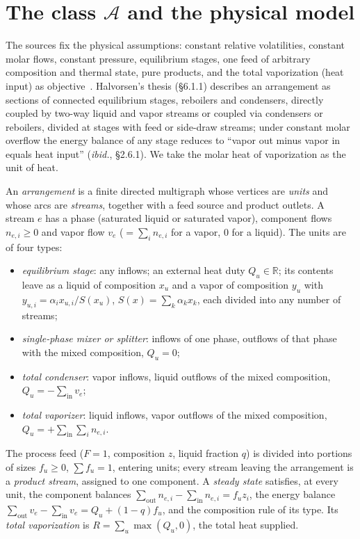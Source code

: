 \section{The class \texorpdfstring{$\mathcal A$}{A} and the physical model}\label{sec:classA}

The sources fix the physical assumptions: constant relative volatilities, constant molar flows, constant pressure,
equilibrium stages, one feed of arbitrary composition and thermal state, pure products, and the total vaporization
(heat input) as objective~\autocite{HS3,HS02,HalvorsenThesis}. Halvorsen's thesis (\S6.1.1) describes an arrangement as
sections of connected equilibrium stages, reboilers and condensers, directly coupled by two-way liquid and vapor
streams or coupled via condensers or reboilers, divided at stages with feed or side-draw streams; under constant molar
overflow the energy balance of any stage reduces to ``vapor out minus vapor in equals heat input'' (\emph{ibid.},
\S2.6.1). We take the molar heat of vaporization as the unit of heat.

\begin{definition}\label{def:A}
An \emph{arrangement} is a finite directed multigraph whose vertices are \emph{units} and whose arcs are
\emph{streams}, together with a feed source and product outlets. A stream $e$ has a phase (saturated liquid or
saturated vapor), component flows $n_{e,i}\ge0$ and vapor flow $v_e$ ($=\sum_in_{e,i}$ for a vapor, $0$ for a liquid).
The units are of four types:
\begin{itemize}
\item[(E)] \emph{equilibrium stage}: any inflows; an external heat duty $Q_u\in\mathbb R$; its contents leave as a liquid of
composition $x_u$ and a vapor of composition $y_u$ with $y_{u,i}=\alpha_ix_{u,i}/S(x_u)$, $S(x)=\sum_k\alpha_kx_k$, each
divided into any number of streams;
\item[(M)] \emph{single-phase mixer or splitter}: inflows of one phase, outflows of that phase with the mixed
composition, $Q_u=0$;
\item[(C)] \emph{total condenser}: vapor inflows, liquid outflows of the mixed composition, $Q_u=-\sum_{\mathrm{in}}v_e$;
\item[(R)] \emph{total vaporizer}: liquid inflows, vapor outflows of the mixed composition, $Q_u=+\sum_{\mathrm{in}}\sum_in_{e,i}$.
\end{itemize}
The process feed ($F=1$, composition $z$, liquid fraction $q$) is divided into portions of sizes $f_u\ge0$, $\sum f_u=1$,
entering units; every stream leaving the arrangement is a \emph{product stream}, assigned to one component. A
\emph{steady state} satisfies, at every unit, the component balances $\sum_{\mathrm{out}}n_{e,i}-\sum_{\mathrm{in}}n_{e,i}=f_uz_i$,
the energy balance $\sum_{\mathrm{out}}v_e-\sum_{\mathrm{in}}v_e=Q_u+(1-q)f_u$, and the composition rule of its type. Its
\emph{total vaporization} is $R=\sum_u\max(Q_u,0)$, the total heat supplied.
\end{definition}

